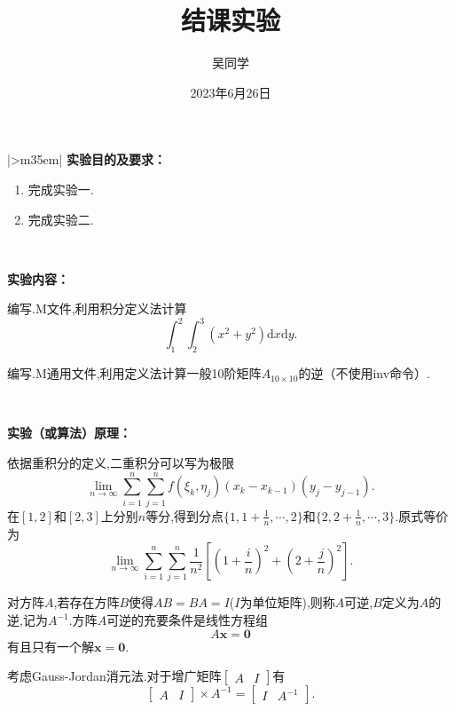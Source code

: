 \documentclass{my_GZUexrept}
\author{吴同学}
\title{结课实验}
\date{2023年6月26日}
\begin{document}
\maketitle
\begin{longtable}[c]{|>{\setlength\parindent{2em}}m{35em}|} \hline
\noindent\textbf{实验目的及要求：}\par
    \begin{enumerate}
            \item 完成实验一.
            \item 完成实验二.
    \end{enumerate}
\\ \hline

\noindent\textbf{实验内容：}\par
    \begin{exercise}[1]
        编写.M文件,利用积分定义法计算
    \[
        \int_1^2\int_2^3 (x^2+y^2) \mathrm{d}x\mathrm{d}y.
    \]
    \end{exercise}

    \begin{exercise}[2]
        编写.M通用文件,利用定义法计算一般10阶矩阵$A_{10\times10}$的逆（不使用inv命令）.
    \end{exercise}
\\ \hline

\noindent\textbf{实验（或算法）原理：}\par
    依据重积分的定义,二重积分可以写为极限
\[
    \lim_{n\rightarrow\infty} \sum_{i=1}^{n} \sum_{j=1}^{n} f(\xi_k,\eta_j)(x_k - x_{k-1})(y_j - y_{j-1}).
\]
在$[1,2]$和$[2,3]$上分别$n$等分,得到分点$\{1,1+\frac{1}{n},\cdots,2\}$和$\{2,2+\frac{1}{n},\cdots,3\}$.原式等价为
\[
    \lim_{n\rightarrow\infty} \sum_{i=1}^{n} \sum_{j=1}^{n} \frac{1}{n^2} [(1+\frac{i}{n})^2 + (2+\frac{j}{n})^2].
\]

    对方阵$A$,若存在方阵$B$使得$AB = BA = I$($I$为单位矩阵),则称$A$可逆,$B$定义为$A$的逆,记为$A^{-1}$.方阵$A$可逆的充要条件是线性方程组
\[
    A\mathbf{x} = \mathbf{0}
\]
有且只有一个解$\mathbf{x} = \mathbf{0}$.

    考虑Gauss-Jordan消元法.对于增广矩阵$\left[ \begin{smallmatrix} A & I\end{smallmatrix}\right]$有
\[
    \begin{bmatrix}A & I\end{bmatrix} \times A^{-1} = \begin{bmatrix}I & A^{-1}\end{bmatrix}.
\]
\\ \hline


\end{longtable}
\end{document}
